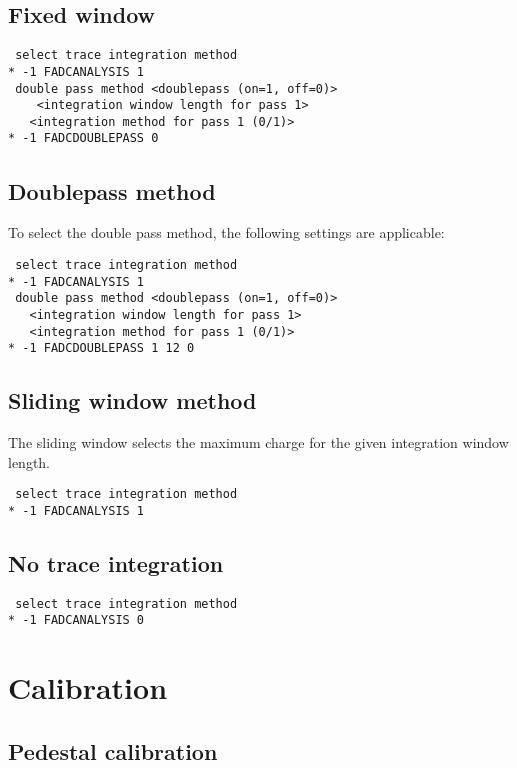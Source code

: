 \documentclass[titlepage,a4paper,twoside,11pt]{report}
\begin{document}
\subsection{Fixed window}

\begin{lstlisting}
 select trace integration method
* -1 FADCANALYSIS 1
 double pass method <doublepass (on=1, off=0)> 
    <integration window length for pass 1>
   <integration method for pass 1 (0/1)>
* -1 FADCDOUBLEPASS 0
\end{lstlisting}

\subsection{Doublepass method}

To select the double pass method, the following settings are applicable:

\begin{lstlisting}
 select trace integration method
* -1 FADCANALYSIS 1
 double pass method <doublepass (on=1, off=0)> 
   <integration window length for pass 1>
   <integration method for pass 1 (0/1)>
* -1 FADCDOUBLEPASS 1 12 0
\end{lstlisting}
  

\subsection{Sliding window method}

The sliding window selects the maximum charge for the given integration window length.

\begin{lstlisting}
 select trace integration method
* -1 FADCANALYSIS 1
\end{lstlisting}

\subsection{No trace integration}

\begin{lstlisting}
 select trace integration method
* -1 FADCANALYSIS 0
\end{lstlisting}

\section{Calibration}

\subsection{Pedestal calibration}
\end{document}
